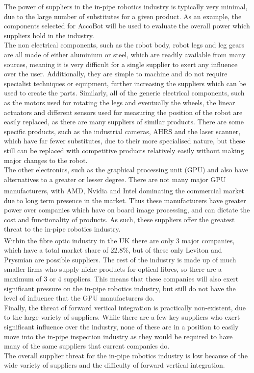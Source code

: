 \documentclass[11pt]{article}		%
\newcommand{\supercite}[1]{\textsuperscript{\cite{#1}}}		%
\begin{document}
				The power of suppliers in the in-pipe robotics industry is typically very minimal, due to the large number of substitutes for a given product.
				As an example, the components selected for AccoBot will be used to evaluate the overall power which suppliers hold in the industry.
				\\
				The non electrical components, such as the robot body, robot legs and leg gears are all made of either aluminium or steel, which are readily available from many sources, meaning it is very difficult for a single supplier to exert any influence over the user.
				Additionally, they are simple to machine and do not require specialist techniques or equipment, further increasing the suppliers which can be used to create the parts.
				Similarly, all of the generic electrical components, such as the motors used for rotating the legs and eventually the wheels, the linear actuators and different sensors used for measuring the position of the robot are easily replaced, as there are many suppliers of similar products.
				There are some specific products, such as the industrial cameras, AHRS and the laser scanner, which have far fewer substitutes, due to their more specialised nature, but these still can be replaced with competitive products relatively easily without making major changes to the robot.
				\\
				The other electronics, such as the graphical processing unit (GPU) and  also have alternatives to a greater or lesser degree.
				There are not many major GPU manufacturers, with AMD, Nvidia and Intel dominating the commercial market\supercite{rake2020graphic} due to long term presence in the market.
				Thus these manufacturers have greater power over companies which have on board image processing, and can dictate the cost and functionality of  products.
				As such, these suppliers offer the greatest threat to the in-pipe robotics industry.
				\\
				Within the fibre optic industry in the UK there are only 3 major companies\supercite{neve2020fibreoptic}, which have a total market share of 22.8\%, but of these only Leviton and Prysmian are possible suppliers.
				The rest of the industry is made up of much smaller firms who supply niche products for optical fibres, so there are a maximum of 3 or 4 suppliers.
				This means that these companies will also exert significant pressure on the in-pipe robotics industry, but still do not have the level of influence that the GPU manufacturers do.
				\\
				Finally, the threat of forward vertical integration is practically non-existent, due to the large variety of suppliers.
				While there are a few key suppliers who exert significant influence over the industry, none of these are in a position to easily move into the in-pipe inspection industry as they would be required to have many of the same suppliers that current companies do.
				\\
				The overall supplier threat for the in-pipe robotics industry is low because of the wide variety of suppliers and the difficulty of forward vertical integration.
						
\end{document}
